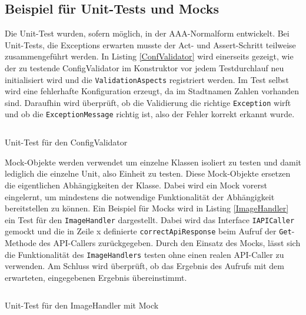 \subsection{Beispiel für Unit-Tests und Mocks}
Die Unit-Test wurden, sofern möglich, in der AAA-Normalform entwickelt. Bei Unit-Tests, die Exceptions erwarten musste der Act- und Assert-Schritt teilweise zusammengeführt werden. In Listing \ref{ConfValidator} wird einerseits gezeigt, wie der zu testende ConfigValidator im Konstruktor vor jedem Testdurchlauf neu initialisiert wird und die \texttt{ValidationAspects} registriert werden. Im Test selbst wird eine fehlerhafte Konfiguration erzeugt, da im Stadtnamen Zahlen vorhanden sind. Daraufhin wird überprüft, ob die Validierung die richtige \texttt{Exception} wirft und ob die \texttt{ExceptionMessage} richtig ist, also der Fehler korrekt erkannt wurde.

\begin{listing}[h]
\inputminted[linenos=true,frame=lines]{csharp}{Listings/ConfigValidatorTest.cs}
\caption{Unit-Test für den ConfigValidator}
\label{ConfValidator}
\end{listing}

Mock-Objekte werden verwendet um einzelne Klassen isoliert zu testen und damit lediglich die einzelne Unit, also Einheit zu testen. Diese Mock-Objekte ersetzen die eigentlichen Abhängigkeiten der Klasse. Dabei wird ein Mock vorerst eingelernt, um mindestens die notwendige Funktionalität der Abhängigkeit bereitstellen zu können. Ein Beispiel für Mocks wird in Listing \ref{ImageHandler} ein Test für den \texttt{ImageHandler} dargestellt. Dabei wird das Interface \texttt{IAPICaller} gemockt und die in Zeile x definierte \texttt{correctApiResponse} beim Aufruf der \texttt{Get}-Methode des API-Callers zurückgegeben. Durch den Einsatz des Mocks, lässt sich die Funktionalität des \texttt{ImageHandlers} testen ohne einen realen API-Caller zu verwenden. Am Schluss wird überprüft, ob das Ergebnis des Aufrufs mit dem erwarteten, eingegebenen Ergebnis übereinstimmt.

\begin{listing}[h]
\inputminted[linenos=true,frame=lines]{csharp}{Listings/ImageHandlerTest.cs}
\caption{Unit-Test für den ImageHandler mit Mock}
\label{ImageHandler}
\end{listing}

